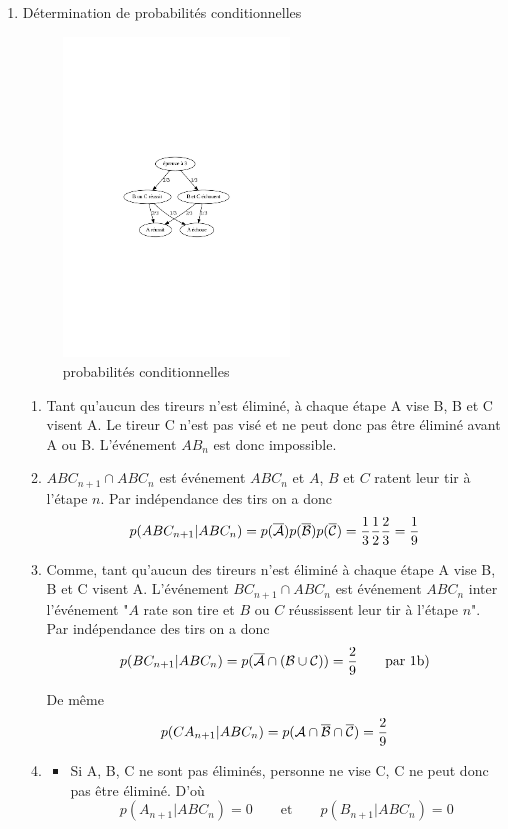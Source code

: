 \begin{enumerate}
\item Détermination de probabilités conditionnelles
\begin{figure}[h]
  \centering
  \includegraphics[width=6cm]{Cproba1_1.pdf}
  \caption{probabilités conditionnelles}
  \label{fig:Cproba1_fig1}
\end{figure}

\begin{enumerate}
\item Tant qu'aucun des tireurs n'est éliminé, à chaque étape A vise B,  B et C visent A. Le tireur C n'est pas visé et ne peut donc pas être éliminé avant A ou B. L'événement $AB_n$ est donc impossible.
\item $ABC_{n+1}\cap ABC_n$ est événement $ABC_n$ et \og$A$, $B$ et $C$ ratent leur tir à l'étape $n$\fg. Par indépendance des tirs on a donc 
$$p(ABC_{n+1}|ABC_n)=p (\overline{{\cal A}})p(\overline{{\cal B}})p(\overline{{\cal C}})=\frac 13\frac12\frac23=\frac19$$
\item Comme, tant qu'aucun des tireurs n'est éliminé à chaque étape A vise B,  B et C visent A. L'événement $BC_{n+1}\cap ABC_n$ est événement $ABC_n$ inter l'événement "$A$ rate son tire et  $B$ ou $C$ réussissent   leur tir à l'étape $n$". Par indépendance des tirs on a donc 
$$p(BC_{n+1}|ABC_n)=p (\overline{{\cal A}}\cap({\cal B}\cup {\cal C)})=\frac29 \qquad \text{par 1b)}$$

De même
 $$p(CA_{n+1}|ABC_n)=p ({{\cal A}}\cap\overline{{\cal B}}\cap\overline{ {\cal C}})=\frac 29$$
\item 
\begin{itemize}
\item Si A, B, C ne sont pas éliminés, personne ne vise C, C  ne peut donc pas  être éliminé. D'où
$$p(A_{n+1}|ABC_n)=0 \qquad \text{et}\qquad p(B_{n+1}|ABC_n)=0$$


\end{itemize}
\end{enumerate}
\end{enumerate}

